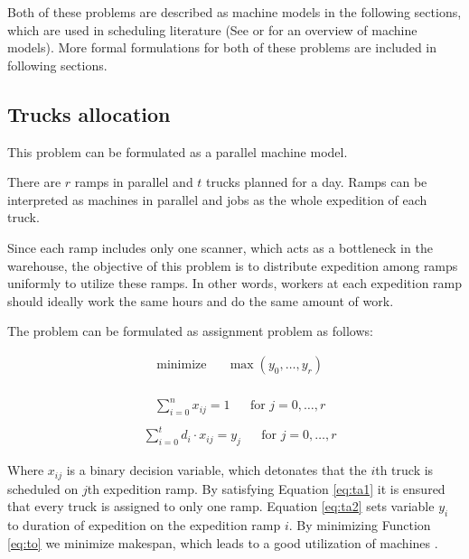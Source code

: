 \documentclass{ctuthesis}
\begin{document}
Both of these problems are described as machine models in the following sections, which are used in scheduling literature (See \cite{pinedo} or \cite{bucker} for an overview of machine models). More formal formulations for both of these problems are included in following sections.
 
 \subsection{Trucks allocation}
 \label{subsec:truckallocation}
This problem can be formulated as a parallel machine model.
 
 There are $r$ ramps in parallel and $t$ trucks planned for a day. Ramps can be interpreted as machines in parallel and jobs as the whole expedition of each truck. 
 
 Since each ramp includes only one scanner, which acts as a bottleneck in the warehouse, the objective of this problem is to distribute expedition among ramps uniformly to utilize these ramps. In other words, workers at each expedition ramp should ideally work the same hours and do the same amount of work. 
 

  The problem can be formulated as assignment problem as follows:
 
 \begin{equation}\label{eq:to}
\begin{aligned}
&\text{minimize}
&&\max(y_0, \ldots, y_r)
\end{aligned}
\end{equation}
\\
\begin{equation} \label{eq:ta1}
\begin{aligned}
    & \sum_{i=0}^{n} x_{ij} = 1 && \text{for } j=0, \ldots, r\\
\end{aligned}
\end{equation}
\begin{equation} \label{eq:ta2}
\begin{aligned}
    & \sum_{i=0}^{t} {d_i} \cdot x_{ij} = y_j && \text{for } j=0, \ldots, r
\end{aligned}
\end{equation}
  
Where $x_{ij}$ is a binary decision variable, which detonates that the $i$th truck is scheduled on $j$th expedition ramp. By satisfying Equation \ref{eq:ta1} it is ensured that every truck is assigned to only one ramp. Equation \ref{eq:ta2} sets variable $y_i$ to duration of expedition on the expedition ramp $i$. By minimizing Function \ref{eq:to} we minimize makespan, which leads to a good utilization of machines \cite{pinedo}.
\end{document}
